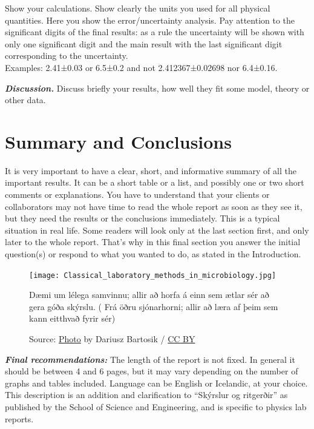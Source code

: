 \documentclass{scrartcl}
\begin{document}
Show your calculations.
Show clearly the units you used for all physical quantities.
Here you show the error/uncertainty analysis.
Pay attention to the significant digits of the final results:
as a rule the uncertainty will be shown with only one significant digit and the main result with the last significant digit corresponding to the uncertainty.\\
Examples: 2.41±0.03 or 6.5±0.2 and not 2.412367±0.02698 nor 6.4±0.16.

\textbf{\textit{Discussion.}} 
Discuss briefly your results, how well they fit some model, theory or other data.

\section{Summary and Conclusions} %

It is very important to have a clear, short, and informative summary of all the important results.
It can be a short table or a list, and possibly one or two short comments or explanations.
You have to understand that your clients or collaborators may not have time to read the whole report as soon as they see it, but they need the results or the conclusions immediately.
This is a typical situation in real life.
Some readers will look only at the last section first, and only later to the whole report.
That’s why in this final section you answer the initial question(s) or respond to what you wanted to do, as stated in the Introduction\cite{abook}.

\begin{figure}[h]
    \centering
    \texttt{[image: Classical\_laboratory\_methods\_in\_microbiology.jpg]}
    \caption{Dæmi um lélega samvinnu; allir að horfa á einn sem ætlar sér að gera góða skýrslu. ( Frá öðru sjónarhorni; allir að læra af þeim sem kann eitthvað fyrir sér)}
    \caption*{Source: \href{https://commons.wikimedia.org/wiki/File:Classical_laboratory_methods_in_microbiology.jpg}{Photo} by Dariusz Bartosik / \href{https://creativecommons.org/licenses/by/2.0/}{CC BY}}
    \label{fig:Þessi_mynd}
\end{figure}

\textbf{\textit{Final recommendations:}} 
The length of the report is not fixed.
In general it should be between 4 and 6 pages, but it may vary depending on the number of graphs and tables included.
Language can be English or Icelandic, at your choice.
This description is an addition and clarification to “Skýrslur og ritgerðir” as published by the School of Science and Engineering, and is specific to physics lab reports.

\newpage
\printbibliography

\end{document}
